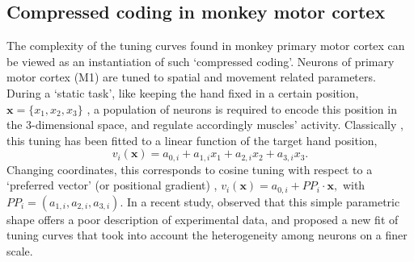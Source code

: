 \documentclass[a4paper]{article}
\begin{document}
\subsection{Compressed coding in monkey motor cortex}

The complexity of the tuning curves found in monkey primary motor cortex can be viewed as an instantiation of  such `compressed coding'. Neurons of primary motor cortex (M1) are tuned to spatial and movement related parameters. During a `static task', like keeping the hand fixed in a certain position, $\textbf{x} = \{x_1,x_2,x_3\}$ , a population of  neurons is required to encode this position in the 3-dimensional space, and regulate accordingly muscles' activity. Classically \cite[]{Wang2007MotorReaching}, this tuning has been fitted to a linear function of the target hand position,
\begin{equation}
v_i(\mathbf{x}) = a_{0,i} +a_{1,i} x_1 + a_{2,i} x_2 +a_{3,i}x_3.
\label{Eq:CosTun}
\end{equation}Changing  coordinates, this corresponds to cosine tuning with respect to a `preferred vector' (or positional gradient) , $
v_i(\mathbf{x}) = a_{0,i} +  PP_i \cdot \mathbf{x},$ with $PP_i = (a_{1,i},a_{2,i},a_{3,i})$. In a recent study, \cite{Lalazar2016TuningConnectivity} observed that this simple parametric shape offers a poor description of experimental data, and proposed a new fit of tuning curves that took into account the heterogeneity among neurons on a finer scale. 
\end{document}
